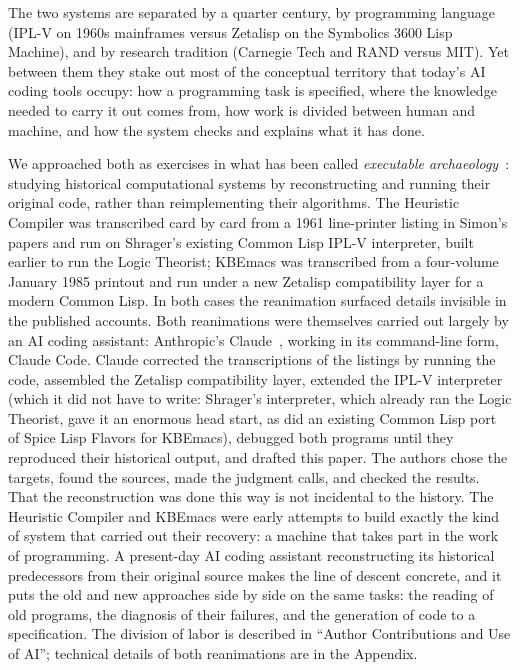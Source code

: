 \documentclass[11pt]{article}
\begin{document}
The two systems are separated by a quarter century, by programming
language (IPL-V on 1960s mainframes versus Zetalisp on the Symbolics
3600 Lisp Machine), and by research tradition (Carnegie Tech and RAND
versus MIT). Yet between them they stake out most of the conceptual
territory that today's AI coding tools occupy: how a programming task
is specified, where the knowledge needed to carry it out comes from,
how work is divided between human and machine, and how the system
checks and explains what it has done.

We approached both as exercises in what has been called
\emph{executable archaeology}~\cite{shrager2026,moewsshrager2026}:
studying historical computational systems by reconstructing and
running their original code, rather than reimplementing their
algorithms. The Heuristic Compiler was transcribed card by card from a
1961 line-printer listing in Simon's papers and run on Shrager's
existing Common Lisp IPL-V interpreter, built earlier to run the Logic
Theorist; KBEmacs was transcribed from a four-volume January 1985
printout and run under a new Zetalisp compatibility layer for a modern
Common Lisp. In both cases the reanimation surfaced details invisible
in the published accounts. Both reanimations were themselves carried
out largely by an AI coding assistant: Anthropic's Claude~\cite{claude}, working in its
command-line form, Claude Code. Claude corrected the transcriptions of
the listings by running the code, assembled the Zetalisp compatibility
layer, extended the IPL-V interpreter (which it did not have to write:
Shrager's interpreter, which already ran the Logic Theorist, gave it an
enormous head start, as did an existing Common Lisp port of Spice Lisp
Flavors for KBEmacs), debugged both programs until they reproduced
their historical output, and drafted this paper. The authors chose the
targets, found the sources, made the judgment calls, and checked the
results. That the reconstruction was done this way is not incidental to
the history. The Heuristic Compiler and KBEmacs were early attempts to
build exactly the kind of system that carried out their recovery: a
machine that takes part in the work of programming. A present-day AI
coding assistant reconstructing its historical predecessors from their
original source makes the line of descent concrete, and it puts the
old and new approaches side by side on the same tasks: the reading of
old programs, the diagnosis of their failures, and the generation of
code to a specification. The division of labor is
described in ``Author Contributions and Use of AI''; technical details
of both reanimations are in the Appendix.
\end{document}
